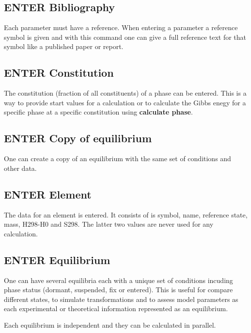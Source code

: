 \documentclass[12pt]{article}
\begin{document}
\subsection{ENTER Bibliography}

Each parameter must have a reference.  When entering a parameter a
reference symbol is given and with this command one can give a full
reference text for that symbol like a published paper or report.

\subsection{ENTER Constitution}

The constitution (fraction of all constituents) of a phase can be
entered.  This is a way to provide start values for a calculation or
to calculate the Gibbs enegy for a specific phase at a specific
constitution using {\bf calculate phase}.

\subsection{ENTER Copy of equilibrium}

One can create a copy of an equilibrium with the same set of
conditions and other data.

\subsection{ENTER Element}

The data for an element is entered.  It consists of is symbol, name,
reference state, mass, H298-H0 and S298.  The latter two values are 
never used for any calculation.

\subsection{ENTER Equilibrium}

One can have several equilibria each with a unique set of conditions
incuding phase status (dormant, suspended, fix or entered).  This is
useful for compare different states, to simulate transformations and
to assess model parameters as each experimental or theoretical
information represented as an equilibrium.  

Each equilibrium is independent and they can be calculated in
parallel.
\end{document}
